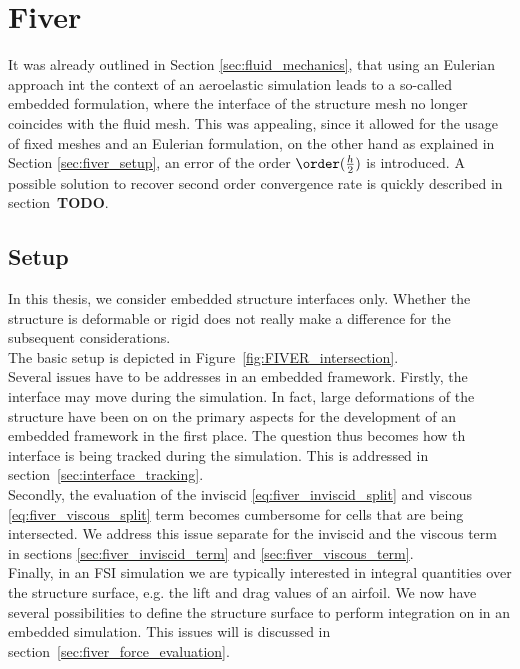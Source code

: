 \documentclass[../main.tex]{subfiles}
\begin{document}
\setlength{\delimitershortfall}{0pt}
\section{Fiver}\label{sec:fiver}

It was already outlined in Section \ref{sec:fluid_mechanics}, that using an Eulerian approach int the context of an aeroelastic simulation leads to a so-called embedded formulation, where the interface of the structure mesh no longer coincides with the fluid mesh. This was appealing, since it allowed for the usage of fixed meshes and an Eulerian formulation, on the other hand as  explained in Section \ref{sec:fiver_setup}, an error of the order $\order(\frac{h}{2})$ is introduced. A possible solution to recover second order convergence rate is quickly described in section~\textbf{TODO}.


\subsection{Setup}
In this thesis, we consider embedded structure interfaces only. Whether the structure is deformable or rigid does not really make a difference for the subsequent considerations.\\
The basic setup is depicted in Figure~\ref{fig:FIVER_intersection}.\\
Several issues have to be addresses in an embedded framework. Firstly, the interface may move during the simulation. In fact, large deformations of the structure have been on on the primary aspects for the development of an embedded framework in the first place. The question thus becomes how th interface is being tracked during the simulation. This is addressed in section~\ref{sec:interface_tracking}.\\
Secondly, the evaluation of the inviscid \eqref{eq:fiver_inviscid_split} and viscous \eqref{eq:fiver_viscous_split} term becomes cumbersome for cells that are being intersected. We address this issue separate for the inviscid and the viscous term in sections \ref{sec:fiver_inviscid_term} and \ref{sec:fiver_viscous_term}.\\
Finally, in an \ac{FSI} simulation we are typically interested in integral quantities over the structure surface, e.g. the lift and drag values of an airfoil. We now have several possibilities to define the structure surface to perform integration on in an embedded simulation. This issues will is discussed in section~\ref{sec:fiver_force_evaluation}.
\end{document}
